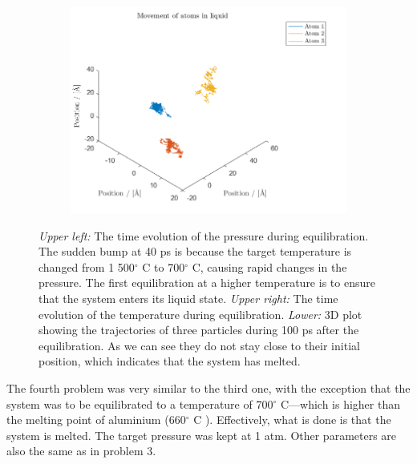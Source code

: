 \begin{figure}[H]
\begin{subfigure}[b]{0.40\textwidth}
    \end{subfigure}
    \begin{subfigure}[b]{0.40\textwidth}
        \centering
        \includegraphics[width=\textwidth]{graphics/task4/traj.png}
    \end{subfigure}
    \caption{\textit{Upper left:} The time evolution of the pressure during equilibration. The sudden bump at 40 ps is because the target temperature is changed from 1 500$^\circ$ C to 700$^\circ$ C, causing rapid changes in the pressure. The first equilibration at a higher temperature is to ensure that the system enters its liquid state. \textit{Upper right:} The time evolution of the temperature during equilibration. \textit{Lower:} 3D plot showing the trajectories of three particles during 100 ps after the equilibration. As we can see they do not stay close to their initial position, which indicates that the system has melted.}
    \label{fig:equilibrium700}
\end{figure}

The fourth problem was very similar to the third one, with the exception that the system was to be equilibrated to a temperature of 700$^\circ$ C---which is higher than the melting point of aluminium (660$^\circ$ C \cite{al_wiki}). Effectively, what is done is that the system is melted. The target pressure was kept at 1 atm. Other parameters are also the same as in problem 3.

